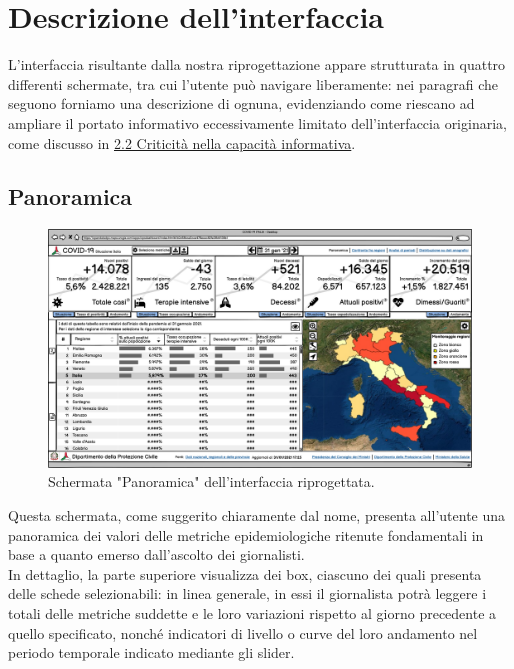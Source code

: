 \documentclass[../../main.tex]{subfiles}
\begin{document}
\clearpage
\section{Descrizione dell'interfaccia}
L'interfaccia risultante dalla nostra riprogettazione appare strutturata in quattro differenti schermate, tra cui l'utente può navigare liberamente: nei paragrafi che seguono forniamo una descrizione di ognuna, evidenziando come riescano ad ampliare il portato informativo eccessivamente limitato dell'interfaccia originaria, come discusso in \hyperref[ss:criticita-informative]{2.2 Criticità nella capacità informativa}.

\subsection{Panoramica}
\begin{figure}[h]
    \centering
    \includegraphics[width = \textwidth]{res/img/1 - Panoramica}
    \caption{Schermata "Panoramica" dell'interfaccia riprogettata.}
    \label{fig:panoramica}
\end{figure}

Questa schermata, come suggerito chiaramente dal nome, presenta all'utente una panoramica dei valori delle metriche epidemiologiche ritenute fondamentali in base a quanto emerso dall'ascolto dei giornalisti.\\
In dettaglio, la parte superiore visualizza dei box, ciascuno dei quali presenta delle schede selezionabili: in linea generale, in essi il giornalista potrà leggere i totali delle metriche suddette e le loro variazioni rispetto al giorno precedente a quello specificato, nonché indicatori di livello o curve del loro andamento nel periodo temporale indicato mediante gli slider.\\
\end{document}
